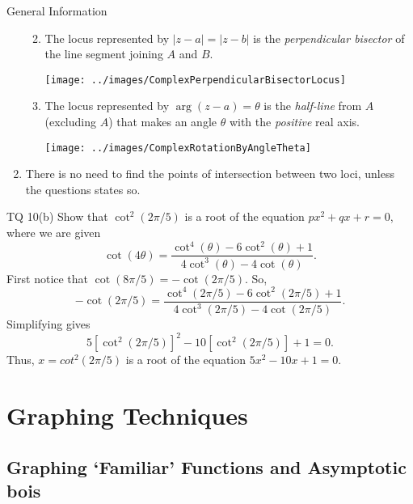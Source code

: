 \documentclass[oneside]{book}
\begin{document}
\begin{stbox}{General Information}
\begin{enumerate}
\begin{enumerate}
\begin{enumerate}
\begin{center}
        \end{center}
      \end{enumerate}
      \newpage
      \item The locus represented by \(\lvert z-a \rvert =\lvert z-b \rvert\) is the \emph{perpendicular bisector} of the line segment joining \(A\) and \(B\).
      \begin{center}
        \texttt{[image: ../images/ComplexPerpendicularBisectorLocus]}
      \end{center}
      \item The locus represented by \(\arg(z-a)=\theta\) is the \emph{half-line} from \(A\) (excluding \(A\)) that makes an angle \(\theta\) with the \emph{positive} real axis.
      \begin{center}
        \texttt{[image: ../images/ComplexRotationByAngleTheta]}
      \end{center}
    \end{enumerate}
    \item There is no need to find the points of intersection between two loci, unless the questions states so. 
  \end{enumerate}
\end{stbox}
\begin{example}{TQ 10(b)}{}
  Show that \(\cot^2(2\pi/5)\) is a root of the equation \(px^2+qx+r=0\), where we are given 
  \[\cot(4\theta)=\frac{\cot^4(\theta)-6\cot^2(\theta)+1}{4\cot^3(\theta)-4\cot(\theta)}.\]
  First notice that \(\cot(8\pi/5)=-\cot(2\pi/5)\). So, 
  \[-\cot(2\pi/5)=\frac{\cot^4(2\pi/5)-6\cot^2(2\pi/5)+1}{4\cot^3(2\pi/5)-4\cot(2\pi/5)}.\]
  Simplifying gives 
  \[5[\cot^2(2\pi/5)]^2-10[\cot^2(2\pi/5)]+1=0.\]
  Thus, \(x=cot^2(2\pi/5)\) is a root of the equation \(5x^2-10x+1=0\). 
\end{example}



\chapter{Graphing Techniques}
\section{Graphing `Familiar' Functions and Asymptotic bois}
\end{document}
